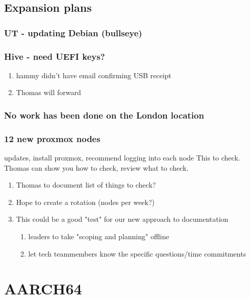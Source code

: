\documentclass[11pt]{article}
\begin{document}
\subsection{Expansion plans}
\label{sec:org6f5d13a}
\subsubsection{UT - updating Debian (bullseye)}
\label{sec:org4576b07}
\subsubsection{Hive - need UEFI keys?}
\label{sec:org26e49f2}
\begin{enumerate}
\item hammy didn't have email confirming USB receipt
\label{sec:org03bafa0}
\item Thomas will forward
\label{sec:orgb8b1ee1}
\end{enumerate}
\subsubsection{No work has been done on the London location}
\label{sec:org5a68f54}
\subsubsection{12 new proxmox nodes}
\label{sec:org0f09bef}
updates, install proxmox, recommend logging into each node
This to check.  Thomas can show you how to check, review what to check.
\begin{enumerate}
\item Thomas to document list of things to check?
\label{sec:orgea93c29}
\item Hope to create a rotation (nodes per week?)
\label{sec:org6fc42d5}
\item This could be a good "test" for our new approach to documentation
\label{sec:orgb249e35}
\begin{enumerate}
\item leaders to take "scoping and planning" offline
\label{sec:org33575fa}
\item let tech teammembers know the specific questions/time commitments
\label{sec:orga2b0b20}
\end{enumerate}
\end{enumerate}
\section{AARCH64}
\label{sec:org773bd8e}
\end{document}
